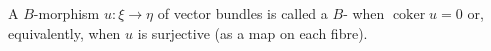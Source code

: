 A $B$-morphism $u: \xi \rightarrow \eta$ of vector bundles is called a $B$- when $\operatorname{coker} u = 0$ or, equivalently, when $u$ is surjective (as a map on each fibre).
